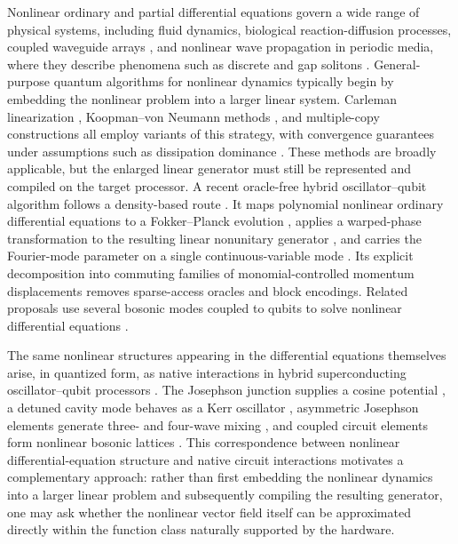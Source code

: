 \documentclass[pra,twocolumn,superscriptaddress,nofootinbib,floatfix]{revtex4-2}
\theoremstyle{remark}
\newcommand{\revcolor}{\color{blue}}
\DeclareRobustCommand{\rev}[1]{{\revcolor #1}}
\begin{document}
Nonlinear ordinary and partial differential equations govern a wide range of physical systems, including fluid dynamics, biological reaction-diffusion processes, coupled waveguide arrays \cite{Christodoulides2003Discretizing}, and nonlinear wave propagation in periodic media, where they describe phenomena such as discrete and gap solitons \cite{newell1985solitons}. General-purpose quantum algorithms for nonlinear dynamics typically begin by embedding the nonlinear problem into a larger linear system. \rev{Carleman linearization \cite{Liu_2021,doi:10.1137/24M1665799}, Koopman--von Neumann methods \cite{Joseph_2020,brunton2021modernkoopmantheorydynamical}, and multiple-copy constructions \cite{lloyd2020quantumalgorithmnonlineardifferential, tennie2024quantumcomputingnonlineardifferential} all employ variants of this strategy, with convergence guarantees under assumptions such as dissipation dominance \cite{Krovi_2023,tennie2024quantumcomputingnonlineardifferential}.} These methods are broadly applicable, but the enlarged linear generator must still be represented and compiled on the target processor. \rev{A recent oracle-free hybrid oscillator--qubit algorithm follows a density-based route \cite{chandramouli2026provableoraclefreequantumalgorithm}.} \rev{It maps polynomial nonlinear ordinary differential equations to a Fokker--Planck evolution \cite{10.1098/rspa.2025.0016}, applies a warped-phase transformation to the resulting linear nonunitary generator \cite{Jin_2024_schrodingerization}, and carries the Fourier-mode parameter on a single continuous-variable mode \cite{Jin_2024_qumodization}.} Its explicit decomposition into commuting families of monomial-controlled momentum displacements removes sparse-access oracles and block encodings. \rev{Related proposals use several bosonic modes coupled to qubits to solve nonlinear differential equations \cite{gan2025provablyefficientquantumalgorithms}.}

\rev{The same nonlinear structures appearing in the differential equations themselves arise, in quantized form, as native interactions in hybrid superconducting oscillator--qubit processors \cite{Liu_2026}.} The Josephson junction supplies a cosine potential \cite{JOSEPHSON1962251, Blais_2021}, a detuned cavity mode behaves as a Kerr oscillator \cite{Kirchmair_2013, Nigg_2012}, asymmetric Josephson elements generate three- and four-wave mixing \cite{Frattini_2017, Frattini_2018}, and coupled circuit elements form nonlinear bosonic lattices \cite{Fitzpatrick_2017, Fedorov_2021}. This correspondence between nonlinear differential-equation structure and native circuit interactions motivates a complementary approach: rather than first embedding the nonlinear dynamics into a larger linear problem and subsequently compiling the resulting generator, one may ask whether the nonlinear vector field itself can be approximated directly within the function class naturally supported by the hardware.
\end{document}
